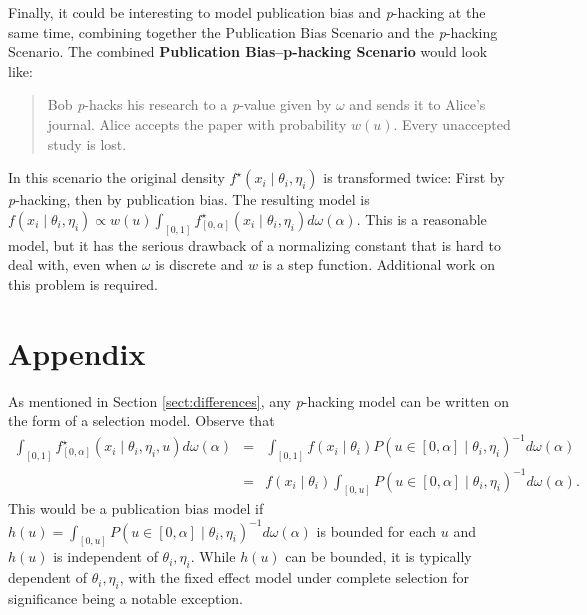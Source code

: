 \documentclass[preprint, authoryear]{elsarticle}
\theoremstyle{plain}
\theoremstyle{definition}
\begin{document}
Finally, it could be interesting to model publication bias and \emph{p}-hacking at the same time, combining together the Publication Bias Scenario and the \emph{p}-hacking Scenario. The combined \textbf{Publication Bias--p-hacking Scenario} would look like:
\begin{quote}
Bob \emph{p}-hacks his research to a \emph{p}-value given by $\omega$ and sends it to Alice's journal. Alice accepts the paper with probability $w\left(u\right)$. Every unaccepted study is lost.
\end{quote}
In this scenario the original density $f^{\star}\left(x_{i}\mid\theta_{i},\eta_{i}\right)$ is transformed twice: First by \emph{p}-hacking, then by publication bias. The resulting model is $f\left(x_{i}\mid\theta_{i},\eta_{i}\right)\propto w\left(u\right)\int_{[0,1]}f_{[0,\alpha]}^{\star}\left(x_{i}\mid\theta_{i},\eta_{i}\right)d\omega\left(\alpha\right)$. This is a reasonable model, but it has the serious drawback of a normalizing constant that is hard to deal with, even when $\omega$ is discrete and $w$ is a step function. Additional work on this problem is required.

\section*{Appendix}
As mentioned in Section \ref{sect:differences}, any \emph{p}-hacking model can be written on the form of a selection model. Observe that
\begin{eqnarray*}
\int_{[0,1]}f_{\left[0,\alpha\right]}^{\star}\left(x_{i}\mid\theta_{i},\eta_{i}, u\right)d\omega\left(\alpha\right) & = & \int_{[0,1]}f\left(x_{i}\mid\theta_{i}\right)P\left(u\in\left[0,\alpha\right]\mid\theta_{i},\eta_{i}\right)^{-1}d\omega\left(\alpha\right)\\
 & = & f\left(x_{i}\mid\theta_{i}\right)\int_{[0,u]}P\left(u\in\left[0,\alpha\right]\mid\theta_{i},\eta_{i}\right)^{-1}d\omega\left(\alpha\right).
\end{eqnarray*}
This would be a publication bias model if $h\left(u\right)=\int_{[0,u]}P\left(u\in\left[0,\alpha\right]\mid\theta_{i},\eta_{i}\right)^{-1}d\omega\left(\alpha\right)$ is bounded for each $u$ and $h\left(u\right)$ is independent of $\theta_{i},\eta_{i}$. While $h\left(u\right)$ can be bounded, it is typically dependent of $\theta_{i},\eta_{i}$, with the fixed effect model under complete selection for significance being a notable exception.
\end{document}
